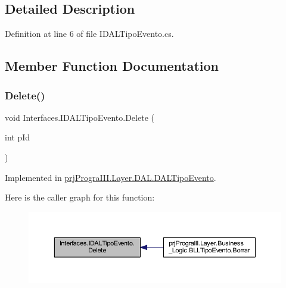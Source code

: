 \subsection{Detailed Description}


Definition at line 6 of file I\+D\+A\+L\+Tipo\+Evento.\+cs.



\subsection{Member Function Documentation}
\hypertarget{interface_interfaces_1_1_i_d_a_l_tipo_evento_acf0a5891c0e73d557860b54f91e329a2}{}\label{interface_interfaces_1_1_i_d_a_l_tipo_evento_acf0a5891c0e73d557860b54f91e329a2} 
\subsubsection{\texorpdfstring{Delete()}{Delete()}}
{\footnotesize\ttfamily void Interfaces.\+I\+D\+A\+L\+Tipo\+Evento.\+Delete (\begin{DoxyParamCaption}\item[{int}]{p\+Id }\end{DoxyParamCaption})}



Implemented in \hyperlink{classprj_progra_i_i_i_1_1_layer_1_1_d_a_l_1_1_d_a_l_tipo_evento_aa48ad58ea22d864d798ac515bb81f899}{prj\+Progra\+I\+I\+I.\+Layer.\+D\+A\+L.\+D\+A\+L\+Tipo\+Evento}.

Here is the caller graph for this function\+:
\nopagebreak
\begin{figure}[H]
\begin{center}
\leavevmode
\includegraphics[width=350pt]{interface_interfaces_1_1_i_d_a_l_tipo_evento_acf0a5891c0e73d557860b54f91e329a2_icgraph}
\end{center}
\end{figure}
\hypertarget{interface_interfaces_1_1_i_d_a_l_tipo_evento_a28e0e3a7b6e9c4f4a04b787905d7270e}{}\label{interface_interfaces_1_1_i_d_a_l_tipo_evento_a28e0e3a7b6e9c4f4a04b787905d7270e} 
